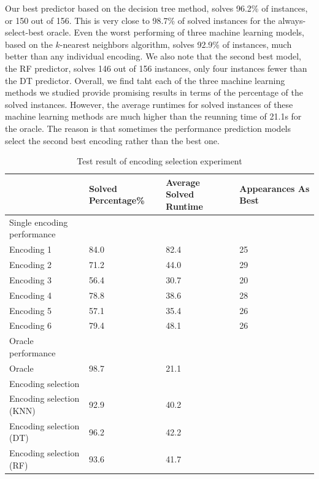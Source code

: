 \documentclass{new_tlp}
\begin{document}
Our best predictor based on the decision tree method, solves 96.2\% of 
instances, or 150 out of 156. This is very close to 98.7\% of solved
instances for the always-select-best oracle. Even the worst performing of 
three machine learning models, based on the $k$-nearest neighbors algorithm,
solves 92.9\% of instances, much better than any individual encoding. We 
also note that the second best model, the RF predictor, solves 146 out of 
156 instances, only four instances fewer than the DT predictor. Overall, we 
find taht each of the three machine learning methods we studied provide 
promising results in terms of the percentage of the solved instances. However, 
the average runtimes for solved instances of these machine learning methods 
are much higher than the reunning time of 21.1s for the oracle. The reason 
is that sometimes the performance prediction models select the second best
encoding rather than the best one.

\begin{table}
\caption{Test result of encoding selection experiment } \label{ecresult1}
\programmath
\begin{tabular}{llll}
\hline\hline
%
                  & Solved Percentage\% & Average Solved Runtime & Appearances As Best \\ \hline%
Single encoding performance & & &                                     \\ %
Encoding 1        & 84.0           & 82.4                      & 25            \\ %
Encoding 2        & 71.2           & 44.0                      & 29            \\ %
Encoding 3        & 56.4           & 30.7                       & 20            \\ %
Encoding 4        & 78.8           & 38.6                      & 28            \\ %
Encoding 5        & 57.1           & 35.4                      & 26            \\ %
Encoding 6        & 79.4           & 48.1                      & 26            \\\hline %
Oracle performance  & & &                                               \\ %
Oracle            & 98.7           & 21.1                      &               \\ \hline
Encoding selection & & &                                                \\ %
Encoding selection (KNN) & 92.9          & 40.2                    &               \\ %
Encoding selection (DT) & 96.2&42.2       &               \\ %
Encoding selection (RF) & 93.6&41.7	      &               \\ %
\hline\hline
\end{tabular}
\programmath
\end{table}
\end{document}

